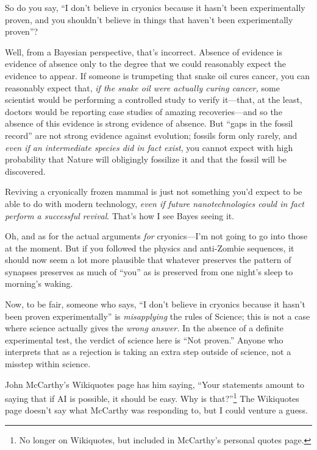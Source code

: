 {
 So do you say, ``I don't believe
in cryonics because it hasn't been experimentally
proven, and you shouldn't believe in things that
haven't been experimentally
proven''?}

{
 Well, from a Bayesian perspective, that's
incorrect. Absence of evidence is evidence of absence only to the
degree that we could reasonably expect the evidence to appear. If
someone is trumpeting that snake oil cures cancer, you can reasonably
expect that, \textit{if the snake oil were actually curing cancer,}
some scientist would be performing a controlled study to verify
it---that, at the least, doctors would be reporting case studies of
amazing recoveries---and so the absence of this evidence is strong
evidence of absence. But ``gaps in the fossil
record'' are not strong evidence against evolution;
fossils form only rarely, and \textit{even if an intermediate species
did in fact exist}, you cannot expect with high probability that Nature
will obligingly fossilize it and that the fossil will be discovered.}

{
 Reviving a cryonically frozen mammal is just not something
you'd expect to be able to do with modern technology,
\textit{even if future nanotechnologies could in fact perform a
successful revival}. That's how I see Bayes seeing it.}

{
 Oh, and as for the actual arguments \textit{for}
cryonics---I'm not going to go into those at the
moment. But if you followed the physics and anti-Zombie sequences, it
should now seem a lot more plausible that whatever preserves the
pattern of synapses preserves as much of
``you'' as is preserved from one
night's sleep to morning's waking.}

{
 Now, to be fair, someone who says, ``I
don't believe in cryonics because it
hasn't been proven experimentally''
is \textit{misapplying} the rules of Science; this is not a case where
science actually gives the \textit{wrong answer.} In the absence of a
definite experimental test, the verdict of science here is
``Not proven.'' Anyone who
interprets that as a rejection is taking an extra step outside of
science, not a misstep within science.}

{
 John McCarthy's Wikiquotes page has him saying,
``Your statements amount to saying that if AI is
possible, it should be easy. Why is
that?''\footnote{No longer on Wikiquotes, but included in
McCarthy's personal quotes page.} The Wikiquotes page
doesn't say what McCarthy was responding to, but I
could venture a guess.}

